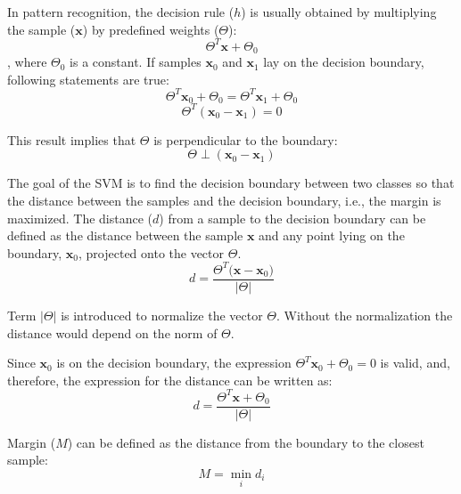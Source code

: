 \begin{appendix}

In pattern recognition, the decision rule ($h$) is usually obtained by multiplying the sample ($\mathbf{x}$) by predefined weights ($\Theta$):
\begin{equation} 
\Theta^T \mathbf{x} + \Theta_0
\end{equation}
\noindent , where $\Theta_0$ is a constant. If samples $\mathbf{x}_0$ and $\mathbf{x}_1$ lay on the decision boundary, following statements are true:
\begin{equation} 
\Theta^T \mathbf{x}_0 + \Theta_0 = \Theta^T \mathbf{x}_1 + \Theta_0
\end{equation}
\begin{equation} 
\Theta^T (\mathbf{x}_0 - \mathbf{x}_1) = 0
\end{equation}

\noindent This result implies that $\Theta$ is perpendicular to the boundary:
\begin{equation} 
\Theta \perp \left(\mathbf{x}_0 - \mathbf{x}_1\right)
\end{equation}


The goal of the SVM is to find the decision boundary between two classes so that the distance between the samples and the decision boundary, i.e., the margin is maximized. The distance ($d$) from a sample to the decision boundary can be defined as the distance between the sample $\mathbf{x}$ and any point lying on the boundary, $\mathbf{x}_0$, projected onto the vector $\Theta$.
\begin{equation} 
d = \frac{\Theta^T \big(\mathbf{x} - \mathbf{x}_0\big)}{\big\vert \Theta \big\vert}
\end{equation}

\noindent Term $\vert \Theta \vert$ is introduced to normalize the vector $\Theta$. Without the normalization the distance would depend on the norm of $\Theta$.

Since $\mathbf{x}_0$ is on the decision boundary, the expression $\Theta^T \mathbf{x}_0 + \Theta_0 = 0$ is valid, and, therefore, the expression for the distance can be written as:
\begin{equation} 
d = \frac{\Theta^T \mathbf{x} + \Theta_0}{\big\vert \Theta \big\vert}
\end{equation}

Margin ($M$) can be defined as the distance from the boundary to the closest sample:
\begin{equation} 
M = \min_i d_i
\end{equation}


\end{appendix}
